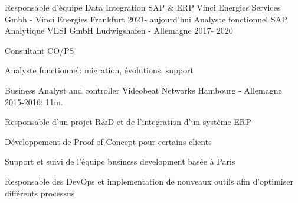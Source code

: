 

\begin{cventries}
        \cventry
                {Responsable d'équipe Data Integration SAP \& ERP} %
                {Vinci Energies Services Gmbh - Vinci Energies} %
                {Frankfurt} %
                {2021- aujourd'hui} %
                {
                }
\cventry
{Analyste fonctionnel SAP Analytique} %
{VESI GmbH} %
{Ludwigshafen - Allemagne} %
{2017- 2020} %
{
	\begin{cvitems} %
		\item {Consultant CO/PS}
		\item {Analyste functionnel: migration, évolutions, support}
	\end{cvitems}
}
  \cventry
    {Business Analyst and controller} %
    {Videobeat Networks} %
    {Hambourg - Allemagne} %
    {2015-2016: 11m.} %
    {
      \begin{cvitems} %
        \item {Responsable d'un projet R\&D et de l'integration d'un système ERP}
        \item {Développement de Proof-of-Concept pour certains clients}
        \item {Support et suivi de l'équipe business development basée à Paris}
        \item {Responsable des DevOps et implementation de nouveaux outils afin d'optimiser différents processus}
      \end{cvitems}
    }


\end{cventries}
